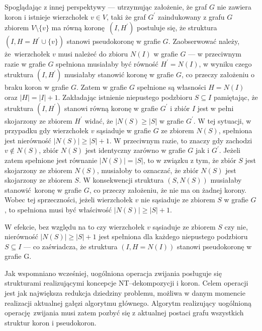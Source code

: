 {\begin{bproof}
    Spoglądając z innej perspektywy --- utrzymując założenie, że graf $G$ nie zawiera koron i istnieje wierzchołek $v \in V$, taki że graf $G^\prime$ zaindukowany z grafu $G$ zbiorem $V \setminus \{v\}$ ma równą koronę $(I, H^\prime)$ postuluje się, że struktura $(I, H=H^\prime \cup \{v\})$ stanowi pseudokoronę w grafie $G$.
    Zaobserwować należy, że wierzchołek $v$ musi należeć do zbioru $N(I)$ w grafie $G$ --- w przeciwnym razie w grafie $G$ spełniona musiałaby być równość $H^\prime=N(I)$, w wyniku czego struktura $(I, H^\prime)$ musiałaby stanowić koronę w grafie $G$, co przeczy założeniu o braku koron w grafie $G$.
    Zatem w grafie $G$ spełnione są własności $H=N(I)$ oraz $|H|=|I|+1$.
    Zakładając istnienie niepustego podzbioru $S \subseteq I$ pamiętając, że struktura $(I, H^\prime)$ stanowi równą koronę w grafie $G^\prime$ i zbiór $I$ jest w pełni skojarzony ze zbiorem $H^\prime$ widać, że $|N(S) \geq |S|$ w grafie $G^\prime$.
    W tej sytuacji, w przypadku gdy wierzchołek $v$ sąsiaduje w grafie $G$ ze zbiorem $N(S)$, spełniona jest nierówność $|N(S)| \geq |S| + 1$.
    W przeciwnym razie, to znaczy gdy zachodzi $v \notin N(S)$, zbiór $N(S)$ jest identyczny zarówno w grafie $G$ jak i $G^\prime$.
    Jeżeli zatem spełnione jest równanie $|N(S)|=|S|$, to w związku z tym, że zbiór $S$ jest skojarzony ze zbiorem $N(S)$, musiałoby to oznaczać, że zbiór $N(S)$ jest skojarzony ze zbiorem $S$.
    W konsekwencji struktura $(S, N(S))$ musiałaby stanowić koronę w grafie $G$, co przeczy założeniu, że nie ma on żadnej korony.
    Wobec tej sprzeczności, jeżeli wierzchołek $v$ nie sąsiaduje ze zbiorem $S$ w grafie $G$, to spełniona musi być właściwość $|N(S)| \geq |S| + 1$.

    W efekcie, bez względu na to czy wierzchołek $v$ sąsiaduje ze zbiorem $S$ czy nie, nierówność $|N(S)| \geq |S| + 1$ jest spełniona dla każdego niepustego podzbioru $S \subseteq I$ --- co zaświadcza, że struktura $(I, H=N(I))$ stanowi pseudokoronę w grafie G.
  \end{bproof}

  Jak wspomniano wcześniej, uogólniona operacja zwijania posługuje się strukturami realizującymi koncepcje NT--dekompozycji i koron.
  Celem operacji jest jak największa redukcja dziedziny problemu, możliwa w danym momencie realizacji aktualnej gałęzi algorytmu głównego.
  Algorytm realizujący uogólnioną operację zwijania musi zatem pozbyć się z aktualnej postaci grafu wszystkich struktur koron i pseudokoron.

}

